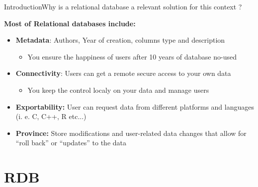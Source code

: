 \documentclass{eecslides}
\begin{document}

\begin{frame}{Introduction}{Why is a relational database a relevant solution for this context ?}
	
	\textbf{Most of Relational databases include:}
	\begin{itemize}
		\item \alert{\textbf{Metadata}}: Authors, Year of creation, columns type and description
			\begin{itemize}
				\item You ensure the happiness of users after 10 years of database no-used
			\end{itemize}
		\item \alert{\textbf{Connectivity}}: Users can get a remote secure access to your own data
			\begin{itemize}
				\item You keep the control localy on your data and manage users
			\end{itemize}
		\item \alert{\textbf{Exportability:}} User can request data from different platforms and languages (i. e. C, C++, R etc...)
		\item \alert{\textbf{Province:}} Store modifications and user-related data changes that allow for “roll back” or “updates” to the data
	\end{itemize}


\end{frame}


\section{RDB}

\end{document}
